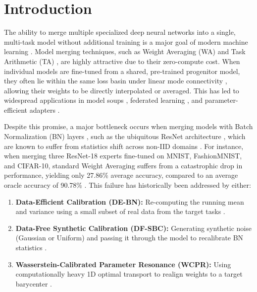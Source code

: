 \documentclass{article}
\theoremstyle{plain}
\theoremstyle{definition}
\theoremstyle{remark}
\begin{document}
\section{Introduction}
\label{sec:intro}

The ability to merge multiple specialized deep neural networks into a single, multi-task model without additional training is a major goal of modern machine learning \cite{izmailov2018averaging, ilharco2022editing, neyshabur2020what, wortsman2022model, matena2022merging}. Model merging techniques, such as Weight Averaging (WA) and Task Arithmetic (TA) \cite{ilharco2022editing, zhang2023composing, ortiz2023task}, are highly attractive due to their zero-compute cost. When individual models are fine-tuned from a shared, pre-trained progenitor model, they often lie within the same loss basin under linear mode connectivity \cite{frankle2020linear, garipov2018loss, draxler2018essentially, entezari2021role}, allowing their weights to be directly interpolated or averaged. This has led to widespread applications in model soups \cite{wortsman2022robust, wortsman2022model}, federated learning \cite{li2021fedbn, andreux2020siloed, maria2021effect}, and parameter-efficient adapters \cite{hu2021lora, he2021towards}.

Despite this promise, a major bottleneck occurs when merging models with Batch Normalization (BN) layers \cite{ioffe2015batch}, such as the ubiquitous ResNet architecture \cite{he2016deep}, which are known to suffer from statistics shift across non-IID domains \cite{li2021fedbn, chang2019domain, sheller2020federated}. For instance, when merging three ResNet-18 experts fine-tuned on MNIST, FashionMNIST, and CIFAR-10, standard Weight Averaging suffers from a catastrophic drop in performance, yielding only 27.86\% average accuracy, compared to an average oracle accuracy of 90.78\% \cite{methodologist_deconstruction}. This failure has historically been addressed by either:
\begin{enumerate}
    \item \textbf{Data-Efficient Calibration (DE-BN):} Re-computing the running mean and variance using a small subset of real data from the target tasks \cite{methodologist_deconstruction, jordan2022repair}.
    \item \textbf{Data-Free Synthetic Calibration (DF-SBC):} Generating synthetic noise (Gaussian or Uniform) and passing it through the model to recalibrate BN statistics \cite{theorist_wasserstein, jin2022dataless}.
    \item \textbf{Wasserstein-Calibrated Parameter Resonance (WCPR):} Using computationally heavy 1D optimal transport to realign weights to a target barycenter \cite{theorist_wasserstein, stoica2023zipit}.
\end{enumerate}
\end{document}
